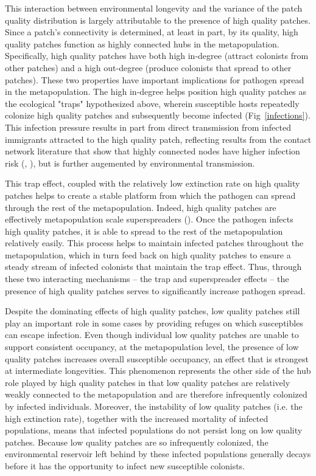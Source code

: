 \documentclass{svjour3}
\begin{document}
This interaction between environmental longevity and the variance of the patch quality distribution is largely attributable to the presence of high quality patches.  Since a patch's connectivity is determined, at least in part, by its quality, high quality patches function as highly connected hubs in the metapopulation.  Specifically, high quality patches have both high in-degree (attract colonists from other patches) and a high out-degree (produce colonists that spread to other patches).  These two properties have important implications for pathogen spread in the metapopulation. The high in-degree helps position high quality patches as the ecological "traps" hypothesized above, wherein susceptible hosts repeatedly colonize high quality patches and subsequently become infected (Fig~\ref{infections}).  This infection pressure results in part from direct transmission from infected immigrants attracted to the high quality patch, reflecting results from the contact network literature that show that highly connected nodes have higher infection risk (\cite{Christley2005}, \cite{Keeling2005}), but is further augemented by environmental transmission.  

This trap effect, coupled with the relatively low extinction rate on high quality patches helps to create a stable platform from which the pathogen can spread through the rest of the metapopulation.  Indeed, high quality patches are effectively metapopulation scale superspreaders (\cite{Lloyd-Smith2005}).  Once the pathogen infects high quality patches, it is able to spread to the rest of the metapopulation relatively easily.  This process helps to maintain infected patches throughout the metapopulation, which in turn feed back on high quality patches to ensure a steady stream of infected colonists that maintain the trap effect.  Thus, through these two interacting mechanisms -- the trap and superspreader effects -- the presence of high quality patches serves to significantly increase pathogen spread.  

Despite the dominating effects of high quality patches, low quality patches still play an important role in some cases by providing refuges on which susceptibles can escape infection. Even though individual low quality patches are unable to support consistent occupancy, at the metapopulation level, the presence of low quality patches increases overall susceptible occupancy, an effect that is strongest at intermediate longevities.   This phenomenon represents the other side of the hub role played by high quality patches in that low quality patches are relatively weakly connected to the metapopulation and are therefore infrequently colonized by infected individuals.  Moreover, the instability of low quality patches (i.e. the high extinction rate), together with the increased mortality of infected populations, means that infected populations do not persist long on low quality patches.  Because low quality patches are so infrequently colonized, the environmental reservoir left behind by these infected populations generally decays before it has the opportunity to infect new susceptible colonists.
\end{document}
